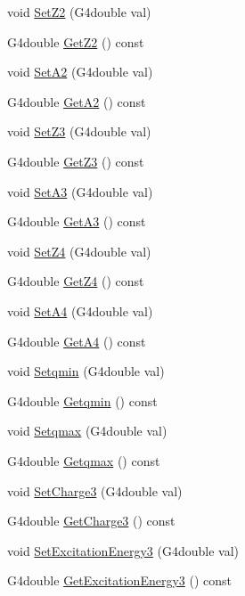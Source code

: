 \begin{DoxyCompactItemize}
void \hyperlink{classEMMAPrimaryGeneratorAction_a1bbda22376ea44787a5aba3f79847b89}{Set\+Z2} (G4double val)
\item 
G4double \hyperlink{classEMMAPrimaryGeneratorAction_ad028d311f822c54b6f18b7399dd92c8a}{Get\+Z2} () const 
\item 
void \hyperlink{classEMMAPrimaryGeneratorAction_a3cf720b827db378a288d8a677cbb8d43}{Set\+A2} (G4double val)
\item 
G4double \hyperlink{classEMMAPrimaryGeneratorAction_a73d7cc1cb3c502040f2f21b19b3232b6}{Get\+A2} () const 
\item 
void \hyperlink{classEMMAPrimaryGeneratorAction_a02159dbc9a40556d2d86e5d0eb1f3ff6}{Set\+Z3} (G4double val)
\item 
G4double \hyperlink{classEMMAPrimaryGeneratorAction_ae7fcf9836463461e3f93a5a420dfab07}{Get\+Z3} () const 
\item 
void \hyperlink{classEMMAPrimaryGeneratorAction_a6a2aa478938aff7f59488b594b23fe51}{Set\+A3} (G4double val)
\item 
G4double \hyperlink{classEMMAPrimaryGeneratorAction_a1288e9b97c08f985ae47fa1b56a71f95}{Get\+A3} () const 
\item 
void \hyperlink{classEMMAPrimaryGeneratorAction_a92a5652ff4a9f5905bf6a49b407f9183}{Set\+Z4} (G4double val)
\item 
G4double \hyperlink{classEMMAPrimaryGeneratorAction_a9fee2f02fa6b797a1d4721093db70342}{Get\+Z4} () const 
\item 
void \hyperlink{classEMMAPrimaryGeneratorAction_a26d5ea23732eab9764542ad00586d73d}{Set\+A4} (G4double val)
\item 
G4double \hyperlink{classEMMAPrimaryGeneratorAction_a76ad6ae5c4822c34c915722f85ef2296}{Get\+A4} () const 
\item 
void \hyperlink{classEMMAPrimaryGeneratorAction_a32f34adbde9466059229d79987a92eb1}{Setqmin} (G4double val)
\item 
G4double \hyperlink{classEMMAPrimaryGeneratorAction_a06928525e796032bf0ed6d1a4f4ee88c}{Getqmin} () const 
\item 
void \hyperlink{classEMMAPrimaryGeneratorAction_a55647c25d00289769a328b938005334c}{Setqmax} (G4double val)
\item 
G4double \hyperlink{classEMMAPrimaryGeneratorAction_ab2da8d263f1ff996856f951c64a754a8}{Getqmax} () const 
\item 
void \hyperlink{classEMMAPrimaryGeneratorAction_a075b821b81088346405bb3c8e596cd8f}{Set\+Charge3} (G4double val)
\item 
G4double \hyperlink{classEMMAPrimaryGeneratorAction_aba253bcca3d2f14bbb92a0910ba7439c}{Get\+Charge3} () const 
\item 
void \hyperlink{classEMMAPrimaryGeneratorAction_a1b9cf54f2ccda6e634203a198a796dfc}{Set\+Excitation\+Energy3} (G4double val)
\item 
G4double \hyperlink{classEMMAPrimaryGeneratorAction_a83e01c94255f470b3e6d88f2ffc9d019}{Get\+Excitation\+Energy3} () const 
\end{DoxyCompactItemize}


